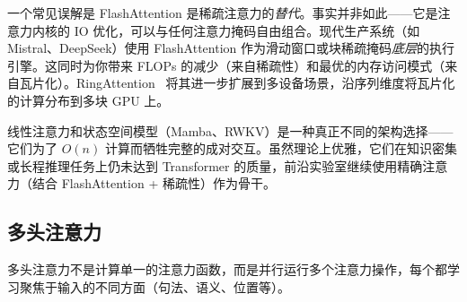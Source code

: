 \begin{intuitionbox}[FlashAttention + 稀疏模式 = 两全其美]
一个常见误解是 FlashAttention 是稀疏注意力的\emph{替代}。事实并非如此——它是注意力内核的 IO 优化，可以与任何注意力掩码自由组合。现代生产系统（如 Mistral、DeepSeek）使用 FlashAttention 作为滑动窗口或块稀疏掩码\emph{底层}的执行引擎。这同时为你带来 FLOPs 的减少（来自稀疏性）和最优的内存访问模式（来自瓦片化）。RingAttention~\cite{liu2023ringattention} 将其进一步扩展到多设备场景，沿序列维度将瓦片化的计算分布到多块 GPU 上。

线性注意力和状态空间模型（Mamba、RWKV）是一种真正不同的架构选择——它们为了 $O(n)$ 计算而牺牲完整的成对交互。虽然理论上优雅，它们在知识密集或长程推理任务上仍未达到 Transformer 的质量，前沿实验室继续使用精确注意力（结合 FlashAttention + 稀疏性）作为骨干。
\end{intuitionbox}

\subsection{多头注意力}
\label{multi-head-attention}

多头注意力不是计算单一的注意力函数，而是并行运行多个注意力操作，每个都学习聚焦于输入的不同方面（句法、语义、位置等）。

